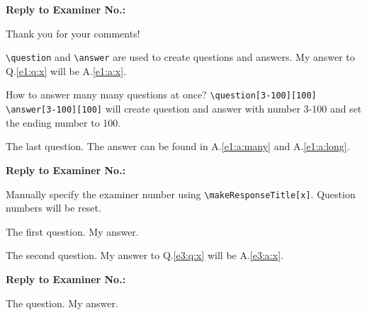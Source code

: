 \documentclass[12pt,a4paper]{Response}
\begin{document}


\makeResponseTitle

\noindent\textbf{Reply to Examiner No.\theexaminer:} \medskip

Thank you for your comments!

\question \label{e1:q:x} \verb|\question| and \verb|\answer| are used to create questions and answers.
\answer \label{e1:a:x} My answer to Q.\ref{e1:q:x} will be A.\ref{e1:a:x}.

\question[3-100][100] How to answer many many questions at once? 
\answer[3-100][100] \label{e1:a:many} \verb|\question[3-100][100]| \verb|\answer[3-100][100]| will create question and answer with number 3-100 and set the ending number to 100.

\question \lipsum[1]
\answer \label{e1:a:long} \lipsum[1-2]

\question The last question.
\answer The answer can be found in A.\ref{e1:a:many} and A.\ref{e1:a:long}.

\makeResponseEnd


\makeResponseTitle[3]

\noindent\textbf{Reply to Examiner No.\theexaminer:} \medskip

Manually specify the examiner number using \verb|\makeResponseTitle[x]|. Question numbers will be reset.

\question The first question.
\answer My answer.

\question \label{e3:q:x} The second question.
\answer \label{e3:a:x} My answer to Q.\ref{e3:q:x} will be A.\ref{e3:a:x}.

\makeResponseEnd


\makeResponseTitle

\noindent\textbf{Reply to Examiner No.\theexaminer:} \medskip

\question The question.
\answer My answer.

\makeResponseEnd
\end{document}
